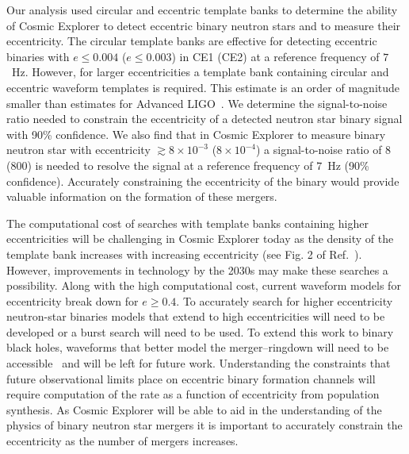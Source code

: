 Our analysis used circular and eccentric template banks to determine the ability of Cosmic Explorer to detect eccentric binary neutron stars and to measure their eccentricity. The circular template banks are effective for detecting eccentric binaries with $e \leq 0.004$ ($e \leq 0.003$) in CE1 (CE2) at a reference frequency of $7$~Hz. However, for larger eccentricities a template bank containing circular and eccentric waveform templates is required. This estimate is an order of magnitude smaller than estimates for Advanced LIGO~\cite{Brown:2009ng, Huerta:2013qb}. We determine the signal-to-noise ratio needed to constrain the eccentricity of a detected neutron star binary signal with 90\% confidence. We also find that in Cosmic Explorer to measure binary neutron star with eccentricity $\gtrsim 8\times 10^{-3}$ ($8\times 10^{-4}$) a signal-to-noise ratio of 8 (800) is needed to resolve the signal at a reference frequency of $7$~Hz (90\% confidence). Accurately constraining the eccentricity of the binary would provide valuable information on the formation of these mergers.

The computational cost of searches with template banks containing higher eccentricities will be challenging in Cosmic Explorer today as the density of the template bank increases with increasing eccentricity (see Fig. 2 of Ref.~\cite{Nitz:2019spj}). However, improvements in technology by the 2030s may make these searches a possibility. Along with the high computational cost, current waveform models for eccentricity break down for $e \geq 0.4$. To accurately search for higher eccentricity neutron-star binaries models that extend to high eccentricities will need to be developed or a burst search will need to be used. To extend this work to binary black holes, waveforms that better model the merger--ringdown will need to be accessible~\cite{Tanay:2016zog, Huerta:2016rwp, Cao:2017ndf, Huerta:2017kez, Hinder:2017sxy} and will be left for future work. Understanding the constraints that future observational limits place on eccentric binary formation channels will require computation of the rate as a function of eccentricity from population synthesis. As Cosmic Explorer will be able to aid in the understanding of the physics of binary neutron star mergers it is important to accurately constrain the eccentricity as the number of mergers increases.
